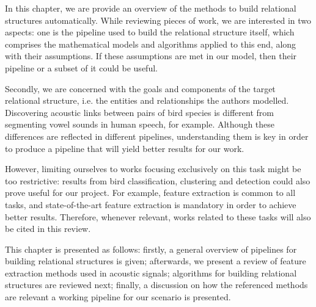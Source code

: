 \documentclass[../main.tex]{subfiles} \label{chapter_soa}
\begin{document}
In this chapter, we are provide an overview of the methods to build relational structures automatically. While reviewing pieces of work, we are interested in two aspects: one is the pipeline used to build the relational structure itself, which comprises the mathematical models and algorithms applied to this end, along with their assumptions. If these assumptions are met in our model, then their pipeline or a subset of it could be useful.
\par Secondly, we are concerned with the goals and components of the target relational structure, i.e. the entities and relationships the authors modelled. Discovering acoustic links between pairs of bird species is different from segmenting vowel sounds in human speech, for example. Although these differences are reflected in different pipelines, understanding them is key in order to produce a pipeline that will yield better results for our work.
\par However, limiting ourselves to works focusing exclusively on this task might be too restrictive: results from bird classification, clustering and detection could also prove useful for our project. For example, feature extraction is common to all tasks, and state-of-the-art feature extraction is mandatory in order to achieve better results. Therefore, whenever relevant, works related to these tasks will also be cited in this review.
\par This chapter is presented as follows: firstly, a general overview of pipelines for building relational structures is given; afterwards, we present a review of feature extraction methods used in acoustic signals; algorithms for building relational structures are reviewed next; finally, a discussion on how the referenced methods are relevant a working pipeline for our scenario is presented.
\end{document}
